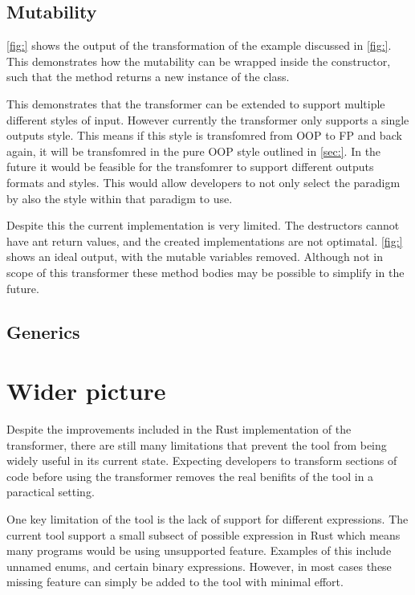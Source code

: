 \documentclass[ oneside,%
                    author={James Elgar},
                    degree={MEng},
                     title={Bidirectional transformer between functional and \\ object-oriented programming in Rust},
                  subtitle={}]{dissertation}
\begin{document}
\subsection{Mutability}

\autoref{fig:} shows the output of the transformation of the example discussed in \autoref{fig:}. This demonstrates how the mutability can be wrapped inside the constructor, such that the method returns a new instance of the class.

This demonstrates that the transformer can be extended to support multiple different styles of input. However currently the transformer only supports a single outputs style. This means if this style is transfomred from OOP to FP and back again, it will be transfomred in the pure OOP style outlined in \autoref{sec:}.
In the future it would be feasible for the transfomrer to support different outputs formats and styles. This would allow developers to not only select the paradigm by also the style within that paradigm to use.

Despite this the current implementation is very limited. The destructors cannot have ant return values, and the created implementations are not optimatal. \autoref{fig:} shows an ideal output, with the mutable variables removed. Although not in scope of this transformer these method bodies may be possible to simplify in the future.

\subsection{Generics}

\section{Wider picture}

Despite the improvements included in the Rust implementation of the transformer, there are still many limitations that prevent the tool from being widely useful in its current state. Expecting developers to transform sections of code before using the transformer removes the real benifits of the tool in a paractical setting.

One key limitation of the tool is the lack of support for different expressions. The current tool support a small subsect of possible expression in Rust which means many programs would be using unsupported feature. Examples of this include unnamed enums, and certain binary expressions. However, in most cases these missing feature can simply be added to the tool with minimal effort.
\end{document}
